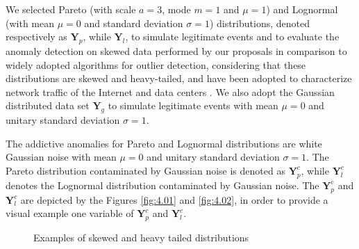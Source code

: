 We selected Pareto (with scale $a=3$, mode $m=1$ and $\mu=1$) and Lognormal (with mean $\mu=0$ and standard deviation $\sigma=1$) distributions, denoted respectively as $\pmb{Y}_p$, while $\pmb{Y}_l$, to simulate legitimate events and to evaluate the anomaly detection on skewed data performed by our proposals in comparison to widely adopted algorithms for outlier detection, considering that these distributions are skewed and heavy-tailed, and have been adopted to characterize network traffic of the Internet and data centers \cite{benson2010network,leon2017probability}. We also adopt the Gaussian distributed data set $\pmb{Y}_g$ to simulate legitimate events with mean $\mu=0$ and unitary standard deviation $\sigma=1$.

The addictive anomalies for Pareto and Lognormal distributions are white Gaussian noise with mean $\mu=0$ and unitary standard deviation $\sigma=1$. The Pareto distribution contaminated by Gaussian noise is denoted as $\pmb{Y}_p^c$, while $\pmb{Y}_l^c$ denotes the Lognormal distribution contaminated by Gaussian noise. The $\pmb{Y}_p^c$ and $\pmb{Y}_l^c$ are depicted by the Figures \ref{fig:4.01} and \ref{fig:4.02}, in order to provide a visual example one variable of $\pmb{Y}_p^c$ and $\pmb{Y}_l^c$.

\begin{figure}[!htb]
	\centering
	\caption[Examples of skewed and heavy tailed distributions]{Examples of skewed and heavy tailed distributions}
	\label{fig:4.03}
\end{figure}

